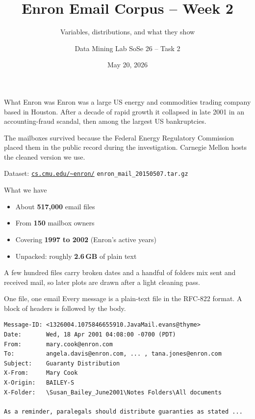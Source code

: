 \documentclass[aspectratio=169,14pt]{beamer}
\title{Enron Email Corpus -- Week 2}
\subtitle{Variables, distributions, and what they show}
\author{Data Mining Lab SoSe 26 -- Task 2}
\institute{TUM, Department of Computer Science}
\date{May 20, 2026}
\begin{document}
\maketitle

\begin{frame}{What Enron was}
  Enron was a large US energy and commodities trading company based in
  Houston. After a decade of rapid growth it collapsed in late 2001 in
  an accounting-fraud scandal, then among the largest US bankruptcies.

  \medskip
  The mailboxes survived because the Federal Energy Regulatory
  Commission placed them in the public record during the investigation.
  Carnegie Mellon hosts the cleaned version we use.

  \medskip
  Dataset:
  \href{https://www.cs.cmu.edu/~enron/}{\texttt{cs.cmu.edu/\textasciitilde enron/}}
  \hfill\small\texttt{enron\_mail\_20150507.tar.gz}
\end{frame}

\begin{frame}{What we have}
  \begin{itemize}
    \item About \textbf{517{,}000} email files
    \item From \textbf{150} mailbox owners
    \item Covering \textbf{1997 to 2002} (Enron's active years)
    \item Unpacked: roughly \textbf{2.6\,GB} of plain text
  \end{itemize}

  \medskip
  \small
  A few hundred files carry broken dates and a handful of folders mix
  sent and received mail, so later plots are drawn after a light
  cleaning pass.
\end{frame}

\begin{frame}[fragile]{One file, one email}
  Every message is a plain-text file in the RFC-822 format. A block of
  headers is followed by the body.

  \medskip
  \scriptsize
  \begin{verbatim}
Message-ID: <1326004.1075846655910.JavaMail.evans@thyme>
Date:       Wed, 18 Apr 2001 04:08:00 -0700 (PDT)
From:       mary.cook@enron.com
To:         angela.davis@enron.com, ... , tana.jones@enron.com
Subject:    Guaranty Distribution
X-From:     Mary Cook
X-Origin:   BAILEY-S
X-Folder:   \Susan_Bailey_June2001\Notes Folders\All documents

As a reminder, paralegals should distribute guaranties as stated ...
  \end{verbatim}
\end{frame}
\end{document}
